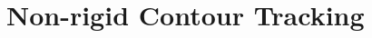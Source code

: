 
\graphicspath{{./images/chapter02/bmps/}{./images/chapter02/vects/}{./images/chapter02/}}

\chapter{Non-rigid Contour Tracking}\label{ch:chapter02}